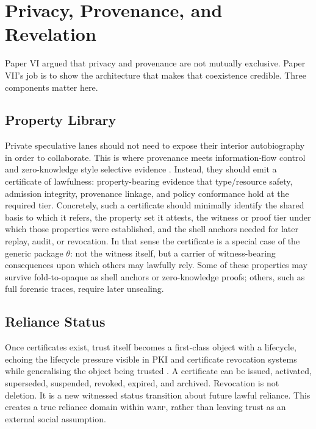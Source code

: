 \documentclass[11pt]{article}
\theoremstyle{definition}
\theoremstyle{plain}
\theoremstyle{remark}
\newcommand{\WARP}{\textsc{warp}}
\begin{document}
\section{Privacy, Provenance, and Revelation}

Paper VI argued that privacy and provenance are not mutually exclusive. Paper VII's job is to show the architecture that makes that coexistence credible. Three components matter here.

\subsection{Property Library}

Private speculative lanes should not need to expose their interior autobiography in order to collaborate. This is where provenance meets information-flow control and zero-knowledge style selective evidence \cite{denning1976lattice,myers1999jflow,goldwasser1989knowledge}. Instead, they should emit a certificate of lawfulness: property-bearing evidence that type/resource safety, admission integrity, provenance linkage, and policy conformance hold at the required tier. Concretely, such a certificate should minimally identify the shared basis to which it refers, the property set it attests, the witness or proof tier under which those properties were established, and the shell anchors needed for later replay, audit, or revocation. In that sense the certificate is a special case of the generic package \(\theta\): not the witness itself, but a carrier of witness-bearing consequences upon which others may lawfully rely. Some of these properties may survive fold-to-opaque as shell anchors or zero-knowledge proofs; others, such as full forensic traces, require later unsealing.

\subsection{Reliance Status}

Once certificates exist, trust itself becomes a first-class object with a lifecycle, echoing the lifecycle pressure visible in PKI and certificate revocation systems while generalising the object being trusted \cite{rfc5280}. A certificate can be issued, activated, superseded, suspended, revoked, expired, and archived. Revocation is not deletion. It is a new witnessed status transition about future lawful reliance. This creates a true reliance domain within \WARP{}, rather than leaving trust as an external social assumption.
\end{document}
